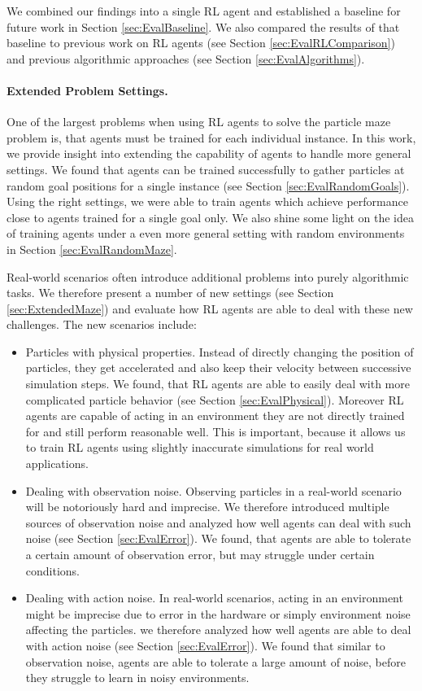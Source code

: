 We combined our findings into a single RL agent and established a baseline for future work in Section \ref{sec:EvalBaseline}. We also compared the results of that baseline to previous work on RL agents (see Section \ref{sec:EvalRLComparison}) and previous algorithmic approaches (see Section \ref{sec:EvalAlgorithms}).


\paragraph{Extended Problem Settings.}
One of the largest problems when using RL agents to solve the particle maze problem is, that agents must be trained for each individual instance. In this work, we provide insight into extending the capability of agents to handle more general settings. We found that agents can be trained successfully to gather particles at random goal positions for a single instance (see Section \ref{sec:EvalRandomGoals}). Using the right settings, we were able to train agents which achieve performance close to agents trained for a single goal only. We also shine some light on the idea of training agents under a even more general setting with random environments in Section \ref{sec:EvalRandomMaze}.

Real-world scenarios often introduce additional problems into purely algorithmic tasks. We therefore present a number of new settings (see Section \ref{sec:ExtendedMaze}) and evaluate how RL agents are able to deal with these new challenges. The new scenarios include: 
\begin{itemize}
    \item Particles with physical properties. Instead of directly changing the position of particles, they get accelerated and also keep their velocity between successive simulation steps. We found, that RL agents are able to easily deal with more complicated particle behavior (see Section \ref{sec:EvalPhysical}). Moreover RL agents are capable of acting in an environment they are not directly trained for and still perform reasonable well. This is important, because it allows us to train RL agents using slightly inaccurate simulations for real world applications.
    \item Dealing with observation noise. Observing particles in a real-world scenario will be notoriously hard and imprecise. We therefore introduced multiple sources of observation noise and analyzed how well agents can deal with such noise (see Section \ref{sec:EvalError}). We found, that agents are able to tolerate a certain amount of observation error, but may struggle under certain conditions.
    \item Dealing with action noise. In real-world scenarios, acting in an environment might be imprecise due to error in the hardware or simply environment noise affecting the particles. we therefore analyzed how well agents are able to deal with action noise (see Section \ref{sec:EvalError}). We found that similar to observation noise, agents are able to tolerate a large amount of noise, before they struggle to learn in noisy environments.
\end{itemize}

